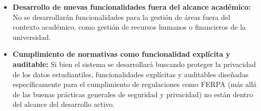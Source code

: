 \begin{itemize}
    \item \textbf{Desarrollo de nuevas funcionalidades fuera del alcance académico:} No se desarrollarán funcionalidades para la gestión de áreas fuera del contexto académico, como gestión de recursos humanos o financieros de la universidad.
    \item \textbf{Cumplimiento de normativas como funcionalidad explícita y auditable:} Si bien el sistema se desarrollará buscando proteger la privacidad de los datos estudiantiles, funcionalidades explícitas y auditables diseñadas específicamente para el cumplimiento de regulaciones como FERPA (más allá de las buenas prácticas generales de seguridad y privacidad) no están dentro del alcance del desarrollo activo.
\end{itemize}
